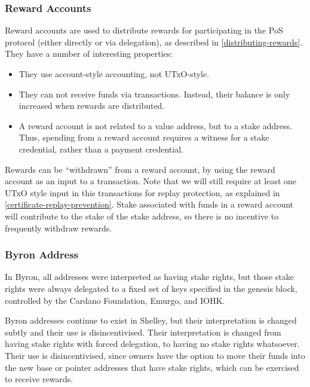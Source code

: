 \documentclass[11pt,a4paper,dvipsnames,twosided]{article}
\begin{document}
\subsubsection{Reward Accounts}
\label{reward-address}

Reward accounts are used to distribute rewards for participating in
the PoS protocol (either directly or via delegation), as described in
\ref{distributing-rewards}. They have a number of interesting
properties:

\begin{itemize}
\item They use account-style accounting, not UTxO-style.
\item They can not receive funds via transactions. Instead, their
  balance is only increased when rewards are distributed.
\item A reward account is not related to a value address, but to a stake
  address. Thus, spending from a reward account requires a witness for a stake
  credential, rather than a payment credential.
\end{itemize}

Rewards can be ``withdrawn'' from a reward account, by using the reward account
as an input to a transaction. Note that we will still require at least one UTxO
style input in this transactions for replay protection, as explained in
\cref{certificate-replay-prevention}. Stake associated with funds in a reward
account will contribute to the stake of the stake address, so there is no
incentive to frequently withdraw rewards.

\subsubsection{Byron Address}
\label{bootstrap-address}

In Byron, all addresses were interpreted as
having stake rights, but those stake rights were always delegated to a fixed set
of keys specified in the genesis block, controlled by the
Cardano Foundation, Emurgo, and IOHK.

Byron addresses continue to exist in Shelley, but their
interpretation is changed subtly and their use is disincentivised.
Their interpretation is changed from having stake rights with
forced delegation, to having no stake rights whatsoever. Their use is
disincentivised, since owners have the option to move their funds into
the new base or pointer addresses that have stake rights, which can be
exercised to receive rewards.
\end{document}
